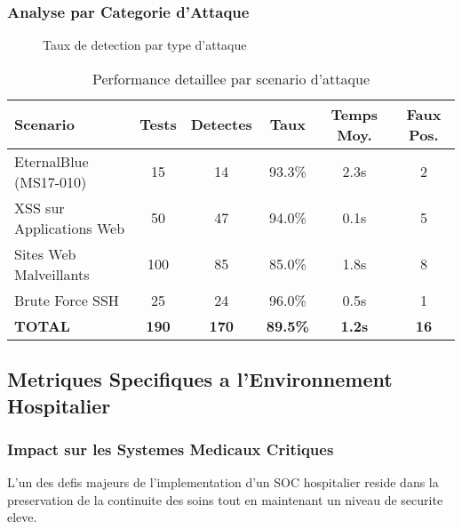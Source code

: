 \subsubsection{Analyse par Categorie d'Attaque}

\begin{figure}[H]
    \centering
    \caption{Taux de detection par type d'attaque}
\end{figure}

\begin{table}[H]
    \centering
    \caption{Performance detaillee par scenario d'attaque}
    \begin{tabular}{|l|c|c|c|c|c|}
        \hline
        \textbf{Scenario}        & \textbf{Tests} & \textbf{Detectes} & \textbf{Taux}   & \textbf{Temps Moy.} & \textbf{Faux Pos.} \\
        \hline
        EternalBlue (MS17-010)   & 15             & 14                & 93.3\%          & 2.3s                & 2                  \\
        \hline
        XSS sur Applications Web & 50             & 47                & 94.0\%          & 0.1s                & 5                  \\
        \hline
        Sites Web Malveillants   & 100            & 85                & 85.0\%          & 1.8s                & 8                  \\
        \hline
        Brute Force SSH          & 25             & 24                & 96.0\%          & 0.5s                & 1                  \\
        \hline
        \textbf{TOTAL}           & \textbf{190}   & \textbf{170}      & \textbf{89.5\%} & \textbf{1.2s}       & \textbf{16}        \\
        \hline
    \end{tabular}
\end{table}

\subsection{Metriques Specifiques a l'Environnement Hospitalier}

\subsubsection{Impact sur les Systemes Medicaux Critiques}

L'un des defis majeurs de l'implementation d'un SOC hospitalier reside dans la preservation de la continuite des soins tout en maintenant un niveau de securite eleve.

